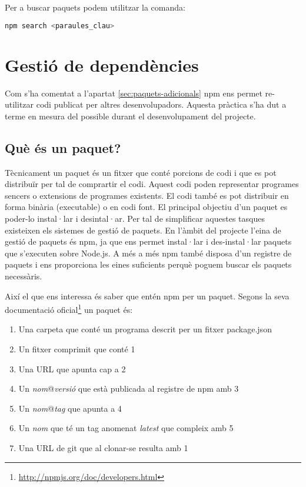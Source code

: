 Per a buscar paquets podem utilitzar la comanda: 

\begin{lstlisting}[language=bash]
npm search <paraules_clau>
\end{lstlisting}

\section{Gestió de dependències}
\label{sec:gestio-dependencies}
Com s'ha comentat a l'apartat \ref{sec:paquets-adicionals} npm ens permet re-utilitzar codi publicat per altres desenvolupadors. Aquesta pràctica s'ha dut a terme en mesura del possible durant el desenvolupament del projecte.  

\subsection{Què és un paquet?}
\label{sec:que-es-un-paquet}

Tècnicament un paquet és un fitxer que conté porcions de codi i que es pot distribuïr per tal de comprartir el codi. Aquest codi poden representar programes sencers o extensions de programes existents. El codi també es pot distribuir en forma binària (executable) o en codi font. El principal objectiu d'un paquet es poder-lo instal·lar i desintal·ar. Per tal de simplificar aquestes tasques existeixen els sistemes de gestió de paquets. En l'àmbit del projecte l'eina de gestió de paquets és npm, ja que ens permet instal·lar i des-instal·lar paquets que s'executen sobre Node.js. A més a més npm també disposa d'un registre de paquets i ens proporciona les eines suficients perquè poguem buscar els paquets necessàris. 

Així el que ens interessa és saber que entén npm per un paquet. Segons la seva documentació oficial\footnote{\url{http://npmjs.org/doc/developers.html}} un paquet és: 

\begin{enumerate}
\item {Una carpeta que conté un programa descrit per un fitxer package.json}
\item {Un fitxer comprimit que conté 1}
\item {Una URL que apunta cap a 2}
\item {Un \emph{nom}@\emph{versió} que està publicada al registre de npm amb 3}
\item {Un \emph{nom}@\emph{tag} que apunta a 4}
\item {Un \emph{nom} que té un tag anomenat \emph{latest} que compleix amb 5}
\item {Una URL de git que al clonar-se resulta amb 1}
\end{enumerate}

